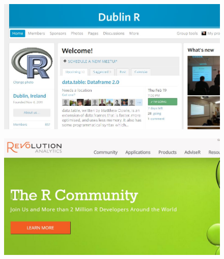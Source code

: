 \documentclass{beamer}
\begin{document}
\begin{frame}
	\begin{figure}
		\centering
		\includegraphics[width=0.99\linewidth]{dublinrpage.jpg}
	\end{figure}
	
\end{frame}	


\begin{frame}
	\begin{figure}
		\centering
		\includegraphics[width=0.99\linewidth]{revoR.jpg}
	\end{figure}
	
\end{frame}	
\end{document}
